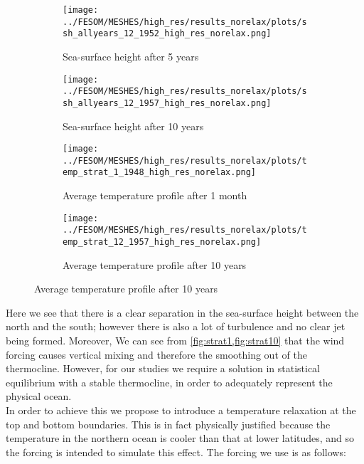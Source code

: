 \begin{figure}[H]
\centering
\begin{subfigure}{0.45\textwidth}
  \centering
  \texttt{[image: ../FESOM/MESHES/high\_res/results\_norelax/plots/ssh\_allyears\_12\_1952\_high\_res\_norelax.png]}
    \captionsetup{width=.8\linewidth}
  	\caption{\footnotesize Sea-surface height after 5 years}
  \label{fig:ssh5}
\end{subfigure}%
\begin{subfigure}{0.45\textwidth}
  \centering
  \texttt{[image: ../FESOM/MESHES/high\_res/results\_norelax/plots/ssh\_allyears\_12\_1957\_high\_res\_norelax.png]}
    \captionsetup{width=.8\linewidth}
  \caption{ \footnotesize Sea-surface height after 10 years}
  \label{fig:ssh10}
\end{subfigure}

\begin{subfigure}{0.45\textwidth}
  \centering
  \texttt{[image: ../FESOM/MESHES/high\_res/results\_norelax/plots/temp\_strat\_1\_1948\_high\_res\_norelax.png]}
    \captionsetup{width=.8\linewidth}
  \caption{\footnotesize Average temperature profile after 1 month}
  \label{fig:strat1}
\end{subfigure}%
\begin{subfigure}{0.45\textwidth}
  \centering
  \texttt{[image: ../FESOM/MESHES/high\_res/results\_norelax/plots/temp\_strat\_12\_1957\_high\_res\_norelax.png]}
    \captionsetup{width=.8\linewidth}
  \caption{ \footnotesize Average temperature profile after 10 years}
  \label{fig:strat10}
\end{subfigure}
\end{figure}
Here we see that there is a clear separation in the sea-surface height between the north and the south; however there is also a lot of turbulence and no clear jet being formed. Moreover, We can see from \cref{fig:strat1,fig:strat10} that the wind forcing causes vertical mixing and therefore the smoothing out of the thermocline. However, for our studies we require a solution in statistical equilibrium with a stable thermocline, in order to adequately represent the physical ocean. \\
\indnt In order to achieve this we propose to introduce a temperature relaxation at the top and bottom boundaries. This is in fact physically justified because the temperature in the northern ocean is cooler than that at lower latitudes, and so the forcing is intended to simulate this effect. The forcing we use is as follows:
